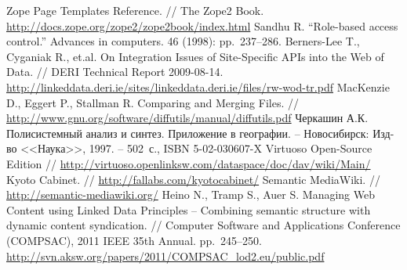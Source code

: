 \documentclass[utf8]{../IncArticle}
\begin{document}
\begin{thebibliography}{11}
 Zope Page Templates Reference. // The Zope2 Book. \url{http://docs.zope.org/zope2/zope2book/index.html}
 Sandhu R. ``Role-based access control.'' Advances in
  computers. 46 (1998): pp.~237--286.
 Berners-Lee T., Cyganiak R., et.al. On Integration
  Issues of Site-Specific APIs into the Web of Data. // DERI Technical
  Report
  2009-08-14. \url{http://linkeddata.deri.ie/sites/linkeddata.deri.ie/files/rw-wod-tr.pdf}
 MacKenzie D., Eggert P., Stallman R. Comparing and
  Merging Files. //
  \url{http://www.gnu.org/software/diffutils/manual/diffutils.pdf}
 Черкашин А.К. Полисистемный анализ и
  синтез. Приложение в географии. -- Новосибирск: Изд-во <<Наука>>,
  1997. -- 502~с., ISBN 5-02-030607-X
 Virtuoso Open-Source Edition //
  \url{http://virtuoso.openlinksw.com/dataspace/doc/dav/wiki/Main/}
 Kyoto Cabinet. // \url{http://fallabs.com/kyotocabinet/}
 Semantic MediaWiki. // \url{http://semantic-mediawiki.org/}
 Heino N., Tramp S., Auer S. Managing Web
  Content using Linked Data Principles – Combining semantic structure
  with dynamic content syndication. // Computer Software and
  Applications Conference (COMPSAC), 2011 IEEE 35th
  Annual. pp.~245--250. \url{http://svn.aksw.org/papers/2011/COMPSAC_lod2.eu/public.pdf}

\end{thebibliography}

\end{document}
